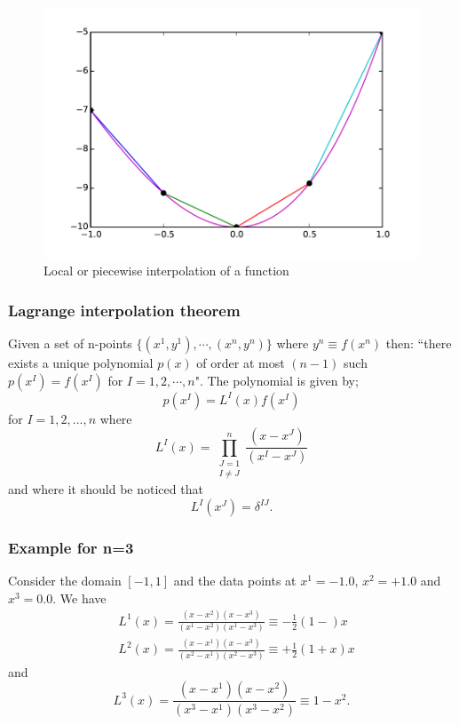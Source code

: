 \begin{figure}[h]
\centering
\includegraphics[width=12cm]{img/interpol2.pdf}
\caption{Local or piecewise interpolation of a function}
\label{fig:interpol2}
\end{figure}

\subsubsection{Lagrange interpolation theorem}
Given a set of n-points $\{ (x^1, y^1),\cdots,(x^n, y^n)\}$ where $y^n \equiv f({x^n})$ then: ``there exists a unique polynomial $p(x)$ of order at most $(n-1)$ such $p(x^I) = f(x^I)$ for $I=1,2,\cdots,n$". The polynomial is given by;
\begin{equation}\label{eq:pol}
  p(x^I) = L^I(x) f(x^I)  
\end{equation}
for $I=1,2,...,n$ where
\begin{equation}\label{eq:coef}
  L^I(x) = \prod_{\substack{J = 1\\ I \ne J}}^n \frac{(x - x^J)}{(x^I - x^J)}
\end{equation}
and where it should be noticed that
\[L^I(x^J) = \delta^{IJ}.\]

\subsubsection*{Example for n=3}
Consider the domain $[ - 1,1]$ and the data points at ${x^1} =  - 1.0$, ${x^2} =  + 1.0$ and ${x^3} = 0.0$. We have
\begin{align*}
& L^1(x) = \frac{(x - x^2)(x - x^3)}{(x^1 - x^2)(x^1-x^3)} \equiv  - \frac{1}{2}(1 - )x\\
& L^2(x) = \frac{(x - x^1)(x - x^3)}{(x^2 - x^1)(x^2 - x^3)} \equiv  + \frac{1}{2}(1 + x)x
\end{align*}
and
\[L^3(x) = \frac{(x - x^1)(x - x^2)}{(x^3 - x^1)(x^3 - x^2)} \equiv 1 - x^2.\]


